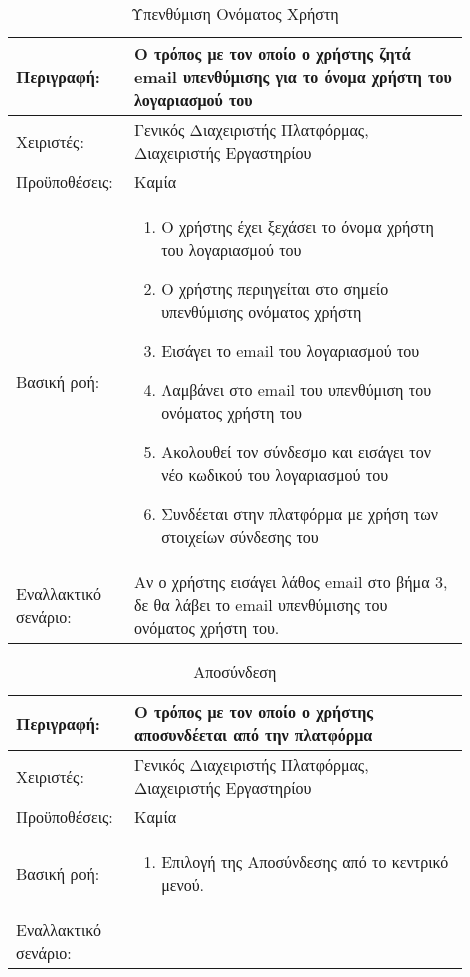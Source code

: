 \begin{table}[h]
	\caption{Υπενθύμιση Ονόματος Χρήστη}
	\label{tab:use-case-forgot-username}
	\begin{tabular}{|p{0.2\linewidth}|p{0.7\linewidth}|}
		\hline
		Περιγραφή: & Ο τρόπος με τον οποίο ο χρήστης ζητά email υπενθύμισης για το όνομα χρήστη του λογαριασμού του \\ \hline
		Χειριστές: & Γενικός Διαχειριστής Πλατφόρμας, Διαχειριστής Εργαστηρίου \\ \hline
		Προϋποθέσεις: & Καμία \\ \hline
		Βασική ροή: & 
		\begin{enumerate}
			\item Ο χρήστης έχει ξεχάσει το όνομα χρήστη του λογαριασμού του
			\item Ο χρήστης περιηγείται στο σημείο υπενθύμισης ονόματος χρήστη
			\item Εισάγει το email του λογαριασμού του
			\item Λαμβάνει στο email του υπενθύμιση του ονόματος χρήστη του
			\item Ακολουθεί τον σύνδεσμο και εισάγει τον νέο κωδικού του λογαριασμού του
			\item Συνδέεται στην πλατφόρμα με χρήση των στοιχείων σύνδεσης του
		\end{enumerate} \\ \hline
		Εναλλακτικό σενάριο: & Αν ο χρήστης εισάγει λάθος email στο βήμα 3, δε θα λάβει το email υπενθύμισης του ονόματος χρήστη του. \\ \hline
	\end{tabular}
\end{table}

\begin{table}[h]
	\caption{Αποσύνδεση}
	\label{tab:use-case-logout}
	\begin{tabular}{|p{0.2\linewidth}|p{0.7\linewidth}|}
		\hline
		Περιγραφή: & Ο τρόπος με τον οποίο ο χρήστης αποσυνδέεται από την πλατφόρμα \\ \hline
		Χειριστές: & Γενικός Διαχειριστής Πλατφόρμας, Διαχειριστής Εργαστηρίου \\ \hline
		Προϋποθέσεις: & Καμία \\ \hline
		Βασική ροή: & 
		\begin{enumerate}
			\item Επιλογή της Αποσύνδεσης από το κεντρικό μενού.
		\end{enumerate} \\ \hline
		Εναλλακτικό σενάριο: & \\ \hline
	\end{tabular}
\end{table}

